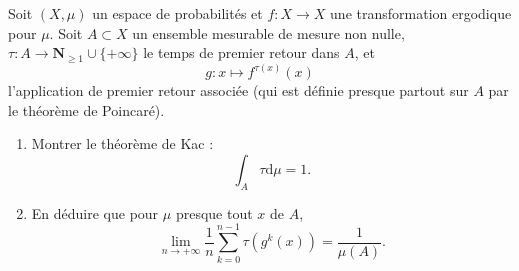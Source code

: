 \documentclass[a4paper,10pt,openany]{article}
\theoremstyle{plain}
\theoremstyle{definition}
\newcommand{\dd}{\mathrm{d}}
\newcommand{\N}{\mathbf{N}}
\begin{document}
\vspace{0.6cm}

 \vspace{1.5mm} 

\noindent Soit $(X, \mu)$ un espace de probabilit\'es et $f : X \to X$ une transformation ergodique pour $\mu$. Soit $A \subset X$ un ensemble mesurable de mesure non nulle, $\tau : A \to \N_{\geqslant 1} \cup \{+\infty\}$ le temps de premier retour dans $A$, et 
$$g : x \mapsto f^{\tau(x)}(x)$$l'application de premier retour associ\'ee (qui est d\'efinie presque partout sur $A$ par le th\'eor\`eme de Poincar\'e). 
\begin{enumerate}
\item Montrer le th\'eor\`eme de Kac : 
$$\displaystyle{\int_A \tau \dd \mu = 1}.$$
\item En d\'eduire que pour $\mu$ presque tout $x$ de $A$,
$$
\lim_{n \to + \infty}\frac{1}{n} \sum_{k=0}^{n-1} \tau\left(g^k(x)\right) = \frac{1}{\mu(A)}.
$$
\end{enumerate}
\end{document}
